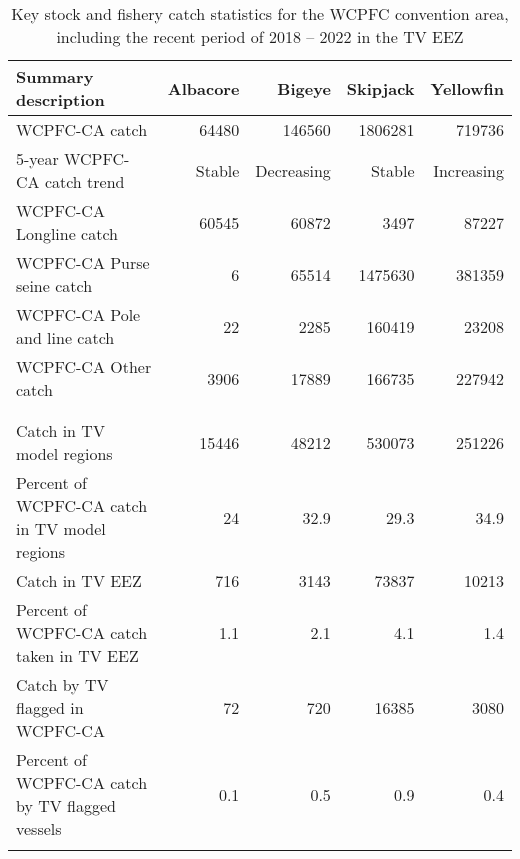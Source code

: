 \begin{longtable}{lrrrr}
\caption{Key stock and fishery catch statistics for the WCPFC convention area, including the recent period of 2018 -- 2022 in the TV EEZ} \\ 
  \hline
Summary description & Albacore & Bigeye & Skipjack & Yellowfin \\ 
  \hline
WCPFC-CA catch & 64480 & 146560 & 1806281 & 719736 \\ 
  5-year WCPFC-CA catch trend & Stable & Decreasing & Stable & Increasing \\ 
  WCPFC-CA Longline catch & 60545 & 60872 & 3497 & 87227 \\ 
  WCPFC-CA Purse seine catch & 6 & 65514 & 1475630 & 381359 \\ 
  WCPFC-CA Pole and line catch & 22 & 2285 & 160419 & 23208 \\ 
  WCPFC-CA Other catch & 3906 & 17889 & 166735 & 227942 \\ 
   &  &  &  &  \\ 
   \hline
 &  &  &  &  \\ 
  Catch in TV model regions & 15446 & 48212 & 530073 & 251226 \\ 
  Percent of WCPFC-CA catch in TV model regions & 24 & 32.9 & 29.3 & 34.9 \\ 
  Catch in TV EEZ & 716 & 3143 & 73837 & 10213 \\ 
  Percent of WCPFC-CA catch taken in TV EEZ & 1.1 & 2.1 & 4.1 & 1.4 \\ 
  Catch by TV flagged in WCPFC-CA & 72 & 720 & 16385 & 3080 \\ 
  Percent of WCPFC-CA catch by TV flagged vessels & 0.1 & 0.5 & 0.9 & 0.4 \\ 
  \hline
\label{cat_sum_tab}
\end{longtable}

